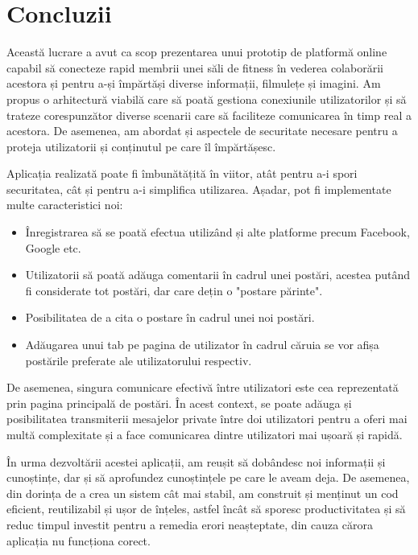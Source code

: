 \chapter{Concluzii}
Această lucrare a avut ca scop prezentarea unui prototip de platformă online capabil să conecteze rapid membrii unei săli de fitness în vederea colaborării acestora și pentru a-și împărtăși diverse informații, filmulețe și imagini.
Am propus o arhitectură viabilă care să poată gestiona conexiunile utilizatorilor și să trateze corespunzător diverse scenarii care să faciliteze comunicarea în timp real a acestora.\newline
De asemenea, am abordat și aspectele de securitate necesare pentru a proteja utilizatorii și conținutul pe care îl împărtășesc.\newline

Aplicația realizată poate fi îmbunătățită în viitor, atât pentru a-i spori securitatea, cât și pentru a-i simplifica utilizarea. Așadar, pot fi implementate multe caracteristici noi:
\begin{itemize}
	\item{Înregistrarea să se poată efectua utilizând și alte platforme precum Facebook, Google etc.}
	\item{Utilizatorii să poată adăuga comentarii în cadrul unei postări, acestea putând fi considerate tot postări, dar care dețin o "postare părinte".}
	\item{Posibilitatea de a cita o postare în cadrul unei noi postări.}
	\item{Adăugarea unui tab pe pagina de utilizator în cadrul căruia se vor afișa postările preferate ale utilizatorului respectiv.}
	\newline
\end{itemize}

De asemenea, singura comunicare efectivă între utilizatori este cea reprezentată prin pagina principală de postări. În acest context, se poate adăuga și posibilitatea transmiterii mesajelor private între doi utilizatori pentru a oferi mai multă complexitate și a face comunicarea dintre utilizatori mai ușoară și rapidă.\newline

În urma dezvoltării acestei aplicații, am reușit să dobândesc noi informații și cunoștințe, dar și să aprofundez cunoștințele pe care le aveam deja. De asemenea, din dorința de a crea un sistem cât mai stabil, am construit și menținut un cod eficient, reutilizabil și ușor de înțeles, astfel încât să sporesc productivitatea și să reduc timpul investit pentru a remedia erori neașteptate, din cauza cărora aplicația nu funcționa corect.

\label{chap:05}